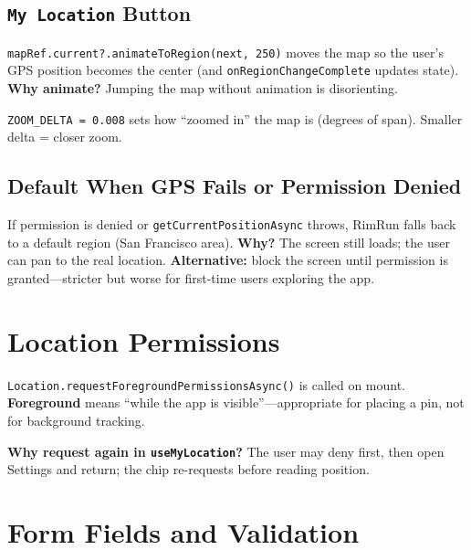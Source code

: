 \documentclass[11pt,a4paper]{article}
\begin{document}
\subsection{\texttt{My Location} Button}

\texttt{mapRef.current?.animateToRegion(next, 250)} moves the map so the user's GPS position becomes the center (and \texttt{onRegionChangeComplete} updates state). \textbf{Why animate?} Jumping the map without animation is disorienting.

\texttt{ZOOM\_DELTA = 0.008} sets how ``zoomed in'' the map is (degrees of span). Smaller delta = closer zoom.

\subsection{Default When GPS Fails or Permission Denied}

If permission is denied or \texttt{getCurrentPositionAsync} throws, RimRun falls back to a default region (San Francisco area). \textbf{Why?} The screen still loads; the user can pan to the real location. \textbf{Alternative:} block the screen until permission is granted---stricter but worse for first-time users exploring the app.

\section{Location Permissions}

\texttt{Location.requestForegroundPermissionsAsync()} is called on mount. \textbf{Foreground} means ``while the app is visible''---appropriate for placing a pin, not for background tracking.

\textbf{Why request again in \texttt{useMyLocation}?} The user may deny first, then open Settings and return; the chip re-requests before reading position.

\section{Form Fields and Validation}
\end{document}
